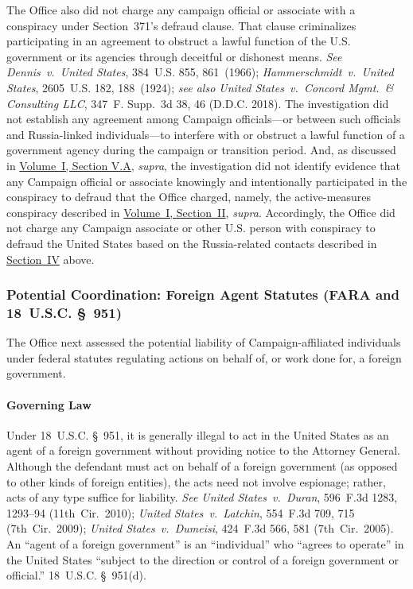 The Office also did not charge any campaign official or associate with a conspiracy under Section~371's defraud clause.
That clause criminalizes participating in an agreement to obstruct a lawful function of the U.S. government or its agencies through deceitful or dishonest means.
\textit{See Dennis~v.\ United States}, 384~U.S. 855, 861~(1966); \textit{Hammerschmidt~v.\ United States}, 2605~U.S. 182, 188~(1924); \textit{see also United States~v.\ Concord Mgmt.\ \& Consulting LLC}, 347~F. Supp.~3d 38, 46 (D.D.C. 2018).
The investigation did not establish any agreement among Campaign officials---or between such officials and Russia-linked individuals---to interfere with or obstruct a lawful function of a government agency during the campaign or transition period.
And, as discussed in \hyperlink{subsection.1.5.1}{Volume~I, Section V.A}, \textit{supra}, the investigation did not identify evidence that any Campaign official or associate knowingly and intentionally participated in the conspiracy to defraud that the Office charged, namely, the active-measures conspiracy described in \hyperlink{section.1.2}{Volume~I, Section~II}, \textit{supra}.
Accordingly, the Office did not charge any Campaign associate or other U.S. person with conspiracy to defraud the United States based on the Russia-related contacts described in \hyperlink{section.1.4}{Section~IV} above.

\subsubsection{Potential Coordination: Foreign Agent Statutes (FARA and 18~U.S.C. \S~951)}
The Office next assessed the potential liability of Campaign-affiliated individuals under federal statutes regulating actions on behalf of, or work done for, a foreign government.

\paragraph{Governing Law}
Under 18~U.S.C. \S~951, it is generally illegal to act in the United States as an agent of a foreign government without providing notice to the Attorney General.
Although the defendant must act on behalf of a foreign government (as opposed to other kinds of foreign entities), the acts need not involve espionage; rather, acts of any type suffice for liability.
\textit{See United States~v.\ Duran}, 596~F.3d 1283, 1293--94 (11th~Cir.~2010); \textit{United States~v.\ Latchin}, 554~F.3d 709, 715 (7th~Cir.~2009); \textit{United States~v.\ Dumeisi}, 424~F.3d 566, 581 (7th~Cir.~2005).
An ``agent of a foreign government'' is an ``individual'' who ``agrees to operate'' in the United States ``subject to the direction or control of a foreign government or official.'' 18~U.S.C. \S~951(d).

